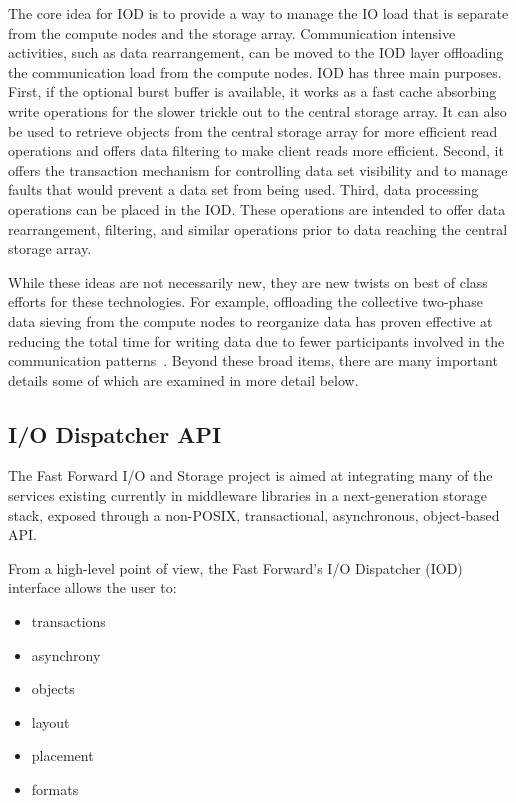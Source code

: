 \documentclass[conference]{IEEEtran}
\begin{document}
The core idea for IOD is to provide a way to manage the IO load that is
separate from the compute nodes and the storage array. Communication intensive
activities, such as data rearrangement, can be moved to the IOD layer
offloading the communication load from the compute nodes. IOD has three main
purposes. First, if the optional burst buffer is available, it works as a fast
cache absorbing write operations for the slower trickle out to the central
storage array. It can also be used to retrieve objects from the central storage
array for more efficient read operations and offers data filtering to make
client reads more efficient.  Second, it offers the transaction mechanism for
controlling data set visibility and to manage faults that would prevent a data
set from being used. Third, data processing operations can be placed in the
IOD. These operations are intended to offer data rearrangement, filtering, and
similar operations prior to data reaching the central storage array.

While these ideas are not necessarily new, they are new twists on best of class
efforts for these technologies. For example, offloading the collective
two-phase data sieving from the compute nodes to reorganize data has proven
effective at reducing the total time for writing data due to fewer participants
involved in the communication patterns~\cite{lofstead:2011:nessie-staging}.
Beyond these broad items, there are many important details some of which are
examined in more detail below.

\subsection{I/O Dispatcher API}
\label{sec:fast-forwards-io-dispatcher-api}

The Fast Forward I/O and Storage project is aimed at integrating many of
the services existing currently in middleware libraries in a
next-generation storage stack, exposed through a non-POSIX,
transactional, asynchronous, object-based API.

From a high-level point of view, the Fast Forward's I/O Dispatcher (IOD)
interface allows the user to:

\begin{itemize}
\itemsep1pt\parskip0pt
\item
  transactions
\item
  asynchrony
\item
  objects
\item
  layout
\item
  placement
\item
  formats
\end{itemize}
\end{document}
